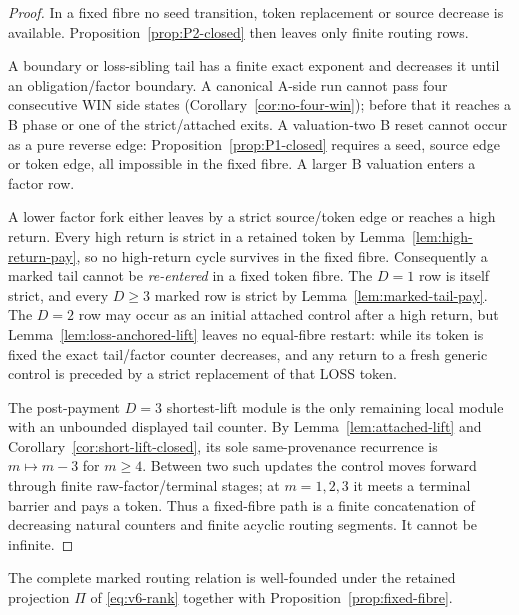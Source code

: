 \begin{proof}
In a fixed fibre no seed transition, token replacement or source decrease is
available.  Proposition~\ref{prop:P2-closed} then leaves only finite routing
rows.

A boundary or loss-sibling tail has a finite exact exponent and decreases it
until an obligation/factor boundary.  A canonical A-side run cannot pass four
consecutive WIN side states (Corollary~\ref{cor:no-four-win}); before that it
reaches a B phase or one of the strict/attached exits.  A valuation-two B
reset cannot occur as a pure reverse edge: Proposition~\ref{prop:P1-closed}
requires a seed, source edge or token edge, all impossible in the fixed
fibre.  A larger B valuation enters a factor row.

A lower factor fork either leaves by a strict source/token edge or reaches a
high return.  Every high return is strict in a retained token by
Lemma~\ref{lem:high-return-pay}, so no high-return cycle survives in the
fixed fibre.  Consequently a marked tail cannot be \emph{re-entered} in a
fixed token fibre.  The $D=1$ row is itself strict, and every $D\ge3$ marked
row is strict by Lemma~\ref{lem:marked-tail-pay}.  The $D=2$ row may occur as an initial attached control after a high return,
but Lemma~\ref{lem:loss-anchored-lift} leaves no equal-fibre restart: while
its token is fixed the exact tail/factor counter decreases, and any return to
a fresh generic control is preceded by a strict replacement of that LOSS
token.

The post-payment $D=3$ shortest-lift module is the only remaining local module
with an unbounded displayed tail counter.  By Lemma~\ref{lem:attached-lift}
and Corollary~\ref{cor:short-lift-closed}, its sole same-provenance recurrence
is $m\mapsto m-3$ for $m\ge4$. Between two such updates the control moves
forward through finite raw-factor/terminal stages; at $m=1,2,3$ it meets a
terminal barrier and pays a token. Thus a fixed-fibre path is a finite
concatenation of decreasing natural counters and finite acyclic routing
segments. It cannot be infinite.
\end{proof}

\begin{proposition}\label{prop:normalizer}
The complete marked routing relation is well-founded under the retained
projection $\Pi$ of \eqref{eq:v6-rank} together with
Proposition~\ref{prop:fixed-fibre}.
\end{proposition}

